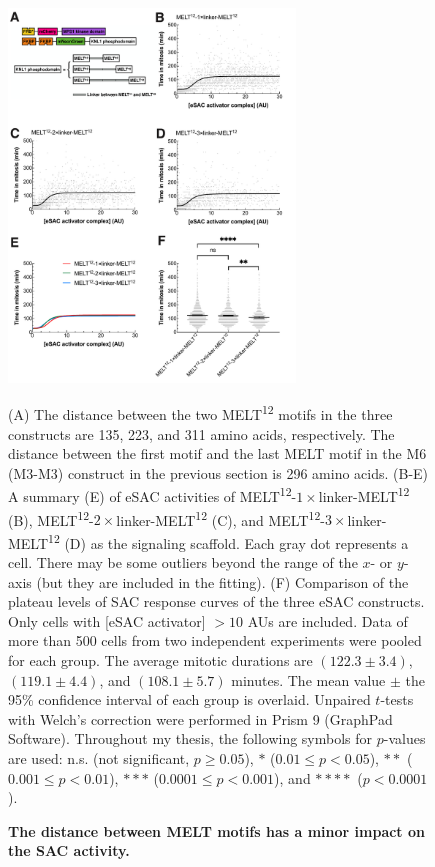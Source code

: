 \begin{figure}
    \centering
    \includegraphics[width=0.68\textwidth]{chapters/figures/DistanceEffect.pdf}
    \caption{\textbf{The distance between MELT motifs has a minor impact on the SAC activity.}}
    \noindent\justifying (A) The distance between the two MELT\textsuperscript{12} motifs in the three constructs are 135, 223, and 311 amino acids, respectively. The distance between the first motif and the last MELT motif in the M6 (M3-M3) construct in the previous section is 296 amino acids. (B-E) A summary (E) of eSAC activities of MELT\textsuperscript{12}-$1\times$linker-MELT\textsuperscript{12} (B), MELT\textsuperscript{12}-$2\times$linker-MELT\textsuperscript{12} (C), and MELT\textsuperscript{12}-$3\times$linker-MELT\textsuperscript{12} (D) as the signaling scaffold. Each gray dot represents a cell. There may be some outliers beyond the range of the $x$- or $y$-axis (but they are included in the fitting).  (F) Comparison of the plateau levels of SAC response curves of the three eSAC constructs. Only cells with [eSAC activator] $> 10$ AUs are included. Data of more than 500 cells from two independent experiments were pooled for each group. The average mitotic durations are $(122.3 \pm 3.4)$, $(119.1 \pm 4.4)$, and $(108.1 \pm 5.7)$ minutes. The mean value $\pm$ the 95\% confidence interval of each group is overlaid. Unpaired $t$-tests with Welch's correction were performed in Prism 9 (GraphPad Software). Throughout my thesis, the following symbols for $p$-values are used: n.s. (not significant, $p \geq 0.05$), ${\ast}$ ($0.01 \leq p < 0.05$), ${\ast}{\ast}$ ($0.001 \leq p < 0.01$), ${\ast}{\ast}{\ast}$ ($0.0001 \leq p < 0.001$), and ${\ast}{\ast}{\ast}{\ast}$ ($p < 0.0001$).
    \label{DistanceEffect}
\end{figure}

